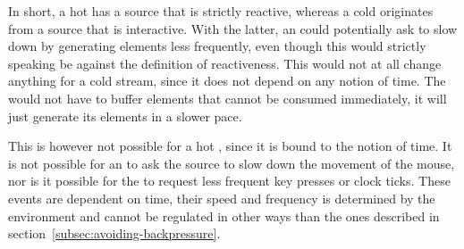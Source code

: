 In short, a hot \obs has a source that is strictly reactive, whereas a cold \obs originates from a source that is interactive. With the latter, an \obv could potentially ask to slow down by generating elements less frequently, even though this would strictly speaking be against the definition of reactiveness. This would not at all change anything for a cold stream, since it does not depend on any notion of time. The \obs would not have to buffer elements that cannot be consumed immediately, it will just generate its elements in a slower pace.

This is however not possible for a hot \obs, since it is bound to the notion of time. It is not possible for an \obv to ask the source to slow down the movement of the mouse, nor is it possible for the \obv to request less frequent key presses or clock ticks. These events are dependent on time, their speed and frequency is determined by the environment \cite{berry1991-Reactive} and cannot be regulated in other ways than the ones described in section~\ref{subsec:avoiding-backpressure}.